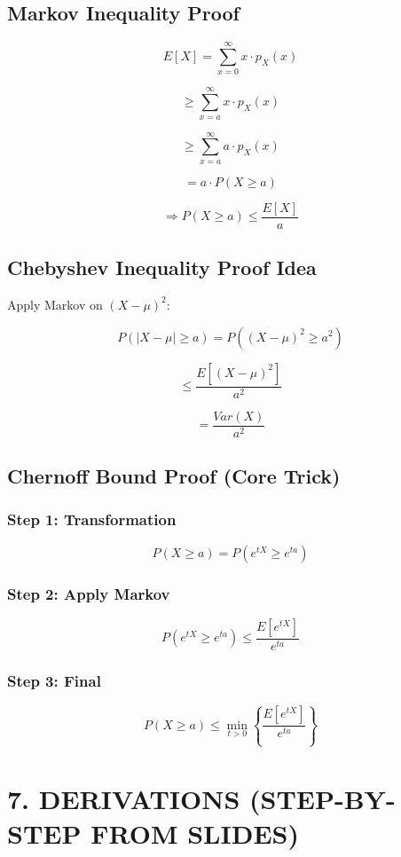 \documentclass[12pt]{article}
\begin{document}
\subsection*{Markov Inequality Proof}

\[
E[X] = \sum_{x=0}^{\infty} x \cdot p_X(x)
\]

\[
\ge \sum_{x=a}^{\infty} x \cdot p_X(x)
\]

\[
\ge \sum_{x=a}^{\infty} a \cdot p_X(x)
\]

\[
= a \cdot P(X \ge a)
\]

\[
\Rightarrow P(X \ge a) \le \frac{E[X]}{a}
\]

\subsection*{Chebyshev Inequality Proof Idea}

Apply Markov on $(X - \mu)^2$:

\[
P(|X - \mu| \ge a) = P((X - \mu)^2 \ge a^2)
\]

\[
\le \frac{E[(X - \mu)^2]}{a^2}
\]

\[
= \frac{Var(X)}{a^2}
\]

\subsection*{Chernoff Bound Proof (Core Trick)}

\subsubsection*{Step 1: Transformation}

\[
P(X \ge a) = P(e^{tX} \ge e^{ta})
\]

\subsubsection*{Step 2: Apply Markov}

\[
P(e^{tX} \ge e^{ta}) \le \frac{E[e^{tX}]}{e^{ta}}
\]

\subsubsection*{Step 3: Final}

\[
P(X \ge a) \le \min_{t>0} \left\{ \frac{E[e^{tX}]}{e^{ta}} \right\}
\]

\section*{7. DERIVATIONS (STEP-BY-STEP FROM SLIDES)}
\end{document}
